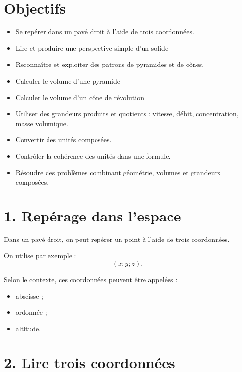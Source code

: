 
\section{Objectifs}

\begin{itemize}
\item Se repérer dans un pavé droit à l'aide de trois coordonnées.
\item Lire et produire une perspective simple d'un solide.
\item Reconnaître et exploiter des patrons de pyramides et de cônes.
\item Calculer le volume d'une pyramide.
\item Calculer le volume d'un cône de révolution.
\item Utiliser des grandeurs produits et quotients : vitesse, débit, concentration, masse volumique.
\item Convertir des unités composées.
\item Contrôler la cohérence des unités dans une formule.
\item Résoudre des problèmes combinant géométrie, volumes et grandeurs composées.
\end{itemize}

\section{1. Repérage dans l'espace}

Dans un pavé droit, on peut repérer un point à l'aide de trois coordonnées.

On utilise par exemple :
\[
(x;y;z).
\]

Selon le contexte, ces coordonnées peuvent être appelées :
\begin{itemize}
\item abscisse ;
\item ordonnée ;
\item altitude.
\end{itemize}


\section{2. Lire trois coordonnées}

